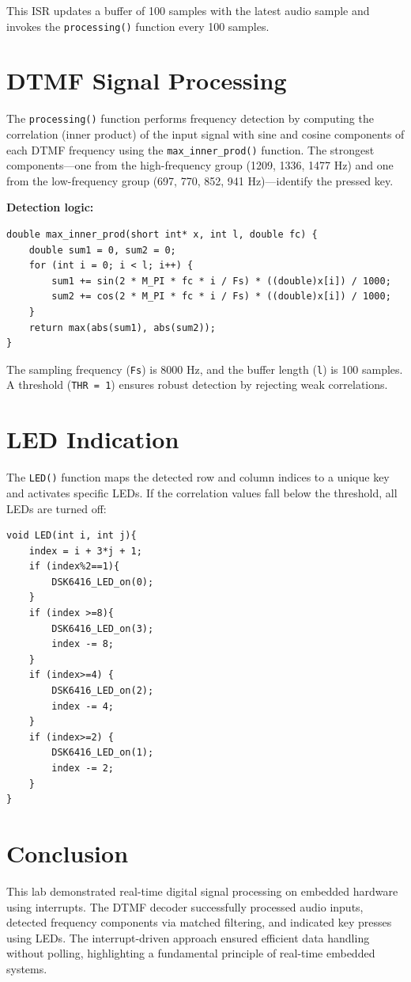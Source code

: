 \documentclass{article}
\begin{document}
This ISR updates a buffer of 100 samples with the latest audio sample and invokes the \texttt{processing()} function every 100 samples.

\section*{DTMF Signal Processing}
The \texttt{processing()} function performs frequency detection by computing the correlation (inner product) of the input signal with sine and cosine components of each DTMF frequency using the \texttt{max\_inner\_prod()} function. The strongest components—one from the high-frequency group (1209, 1336, 1477 Hz) and one from the low-frequency group (697, 770, 852, 941 Hz)—identify the pressed key.

\textbf{Detection logic:}
\begin{lstlisting}
double max_inner_prod(short int* x, int l, double fc) {
    double sum1 = 0, sum2 = 0;
    for (int i = 0; i < l; i++) {
        sum1 += sin(2 * M_PI * fc * i / Fs) * ((double)x[i]) / 1000;
        sum2 += cos(2 * M_PI * fc * i / Fs) * ((double)x[i]) / 1000;
    }
    return max(abs(sum1), abs(sum2));
}
\end{lstlisting}

The sampling frequency (\texttt{Fs}) is 8000 Hz, and the buffer length (\texttt{l}) is 100 samples. A threshold (\texttt{THR = 1}) ensures robust detection by rejecting weak correlations.

\section*{LED Indication}
The \texttt{LED()} function maps the detected row and column indices to a unique key and activates specific LEDs. If the correlation values fall below the threshold, all LEDs are turned off:

\begin{lstlisting}
void LED(int i, int j){
    index = i + 3*j + 1;
    if (index%2==1){
        DSK6416_LED_on(0);
    } 
    if (index >=8){
        DSK6416_LED_on(3);
        index -= 8;
    } 
    if (index>=4) {
        DSK6416_LED_on(2);
        index -= 4;
    } 
    if (index>=2) {
        DSK6416_LED_on(1);
        index -= 2;
    }
}
\end{lstlisting}

\section*{Conclusion}
This lab demonstrated real-time digital signal processing on embedded hardware using interrupts. The DTMF decoder successfully processed audio inputs, detected frequency components via matched filtering, and indicated key presses using LEDs. The interrupt-driven approach ensured efficient data handling without polling, highlighting a fundamental principle of real-time embedded systems.
\end{document}
